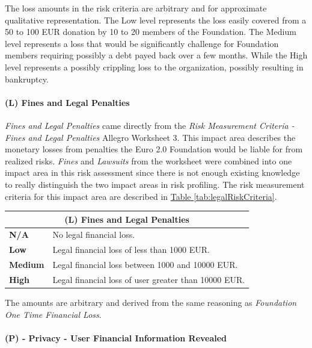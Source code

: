 \documentclass[12pt]{article} %
\newcommand{\hypertableref}[1]{\hyperref[#1]{Table \ref{#1}}}
\begin{document}
{The loss amounts in the risk criteria are arbitrary and for approximate qualitative representation. The Low level represents the loss easily covered from a 50 to 100 EUR donation by 10 to 20 members of the Foundation. The Medium level represents a loss that would be significantly challenge for Foundation members requiring possibly a debt payed back over a few months. While the High level represents a possibly crippling loss to the organization, possibly resulting in bankruptcy.

\paragraph{(L) Fines and Legal Penalties}

\textit{Fines and Legal Penalties} came directly from the \textit{Risk Measurement Criteria - Fines and Legal Penalties} Allegro Worksheet 3. This impact area describes the monetary losses from penalties the Euro 2.0 Foundation would be liable for from realized risks. \textit{Fines} and \textit{Lawsuits} from the worksheet were combined into one impact area in this risk assessment since there is not enough existing knowledge to really distinguish the two impact areas in risk profiling. The risk measurement criteria for this impact area are described in \hypertableref{tab:legalRiskCriteria}.

\begin{center}
\begin{tabular}{ | l | p{12cm} | }
  \hline
  \multicolumn{2}{|c|}{\textbf{(L) Fines and Legal Penalties}}
  \\ \hline
  \textbf{N/A} & No legal financial loss.
  \\ \hline
  \textbf{Low} & Legal financial loss of less than 1000 EUR.
  \\ \hline
  \textbf{Medium} & Legal financial loss between 1000 and 10000 EUR.
  \\ \hline
  \textbf{High} & Legal financial loss of user greater than 10000 EUR.
  \\ \hline
\end{tabular}
\end{center}
\label{tab:legalRiskCriteria}

The amounts are arbitrary and derived from the same reasoning as \textit{Foundation One Time Financial Loss}.

\paragraph{(P) - Privacy - User Financial Information Revealed}

}
\end{document}
